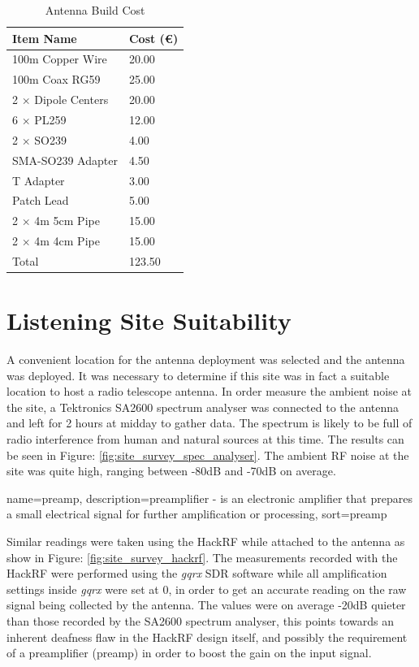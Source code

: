 \documentclass[runningheads,a4paper]{llncs}
\begin{document}
%
\begin{table}
  \centering
  \begin{tabular}{p{8cm} l}
    \toprule
    Item Name & Cost (\euro) \\ \midrule
    100m Copper Wire & 20.00  \\
    100m Coax RG59 & 25.00  \\
    2 $\times$ Dipole Centers & 20.00 \\
    6 $\times$ PL259 & 12.00 \\
    2 $\times$ SO239 & 4.00 \\
    SMA-SO239 Adapter & 4.50 \\
    T Adapter & 3.00 \\
    Patch Lead & 5.00 \\
    2 $\times$ 4m 5cm Pipe & 15.00 \\
    2 $\times$ 4m 4cm Pipe & 15.00 \\
    \bottomrule
    Total & 123.50
  \end{tabular}
  \caption{Antenna Build Cost}
  \label{tab:antenna_build_cost}
\end{table}
%


\section*{Listening Site Suitability}
A convenient location for the antenna deployment was selected and the antenna was deployed. It was necessary to determine if this site was in fact a suitable location to host a radio telescope antenna. In order measure the ambient noise at the site, a Tektronics SA2600 spectrum analyser was connected to the antenna and left for 2 hours at midday to gather data. The spectrum is likely to be full of radio interference from human and natural sources at this time. The results can be seen in Figure: \ref{fig:site_survey_spec_analyser}. The ambient \gls{RF} noise at the site was quite high, ranging between -80dB and -70dB on average. 

{
  name={preamp},
  description={preamplifier - is an electronic amplifier that prepares a small electrical signal for further amplification or processing},
  sort=preamp
}

Similar readings were taken using the HackRF while attached to the antenna as show in Figure: \ref{fig:site_survey_hackrf}. The measurements recorded with the HackRF were performed using the \textit{gqrx} \gls{SDR} software while all amplification settings inside \textit{gqrx} were set at 0, in order to get an accurate reading on the raw signal being collected by the antenna. The values were on average -20dB quieter than those recorded by the SA2600 spectrum analyser, this points towards an inherent deafness flaw in the HackRF design itself, and possibly the requirement of a preamplifier (\gls{preamp}) in order to boost the gain on the input signal. 
\end{document}
